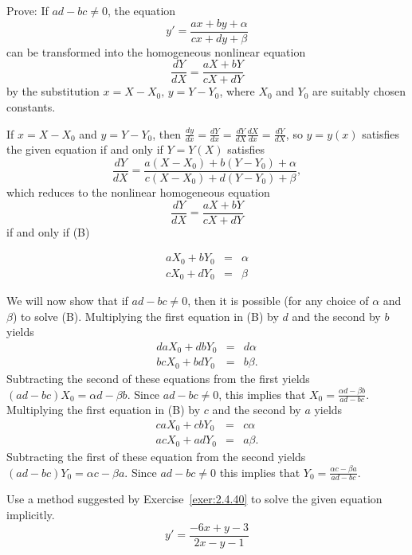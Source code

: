 \documentclass{ximera}
\begin{document}
\begin{problem}\label{exer:2.4.40}
Prove:  If $ad-bc\neq 0$, the equation
$$
y'=\frac{ax+by+\alpha}{cx+dy+\beta}
$$
can be transformed into the homogeneous nonlinear equation
$$
\frac{dY}{dX}=\frac{aX+bY}{cX+dY}
$$
by the substitution $x=X-X_0,\,  y=Y-Y_0$,
where $X_0$ and $Y_0$ are suitably chosen constants.

\begin{solution}
    If $x=X-X_0$ and $y=Y-Y_0$, then $\frac{dy}{ dx}=\frac{dY}{
dx}=\frac{dY}{ dX}\frac{dX}{ dx}=\frac{dY}{ dX}$, so $y=y(x)$
satisfies the given equation if and only if $Y=Y(X)$ satisfies
 $$
\frac{dY}{dX}=\frac{a(X-X_0)+b(Y-Y_0)+\alpha}{
c(X-X_0)+d(Y-Y_0)+\beta},
$$
 which reduces to the nonlinear homogeneous equation
$$
\frac{dY}{ dX}=\frac{aX+bY}{ cX+dY}
$$
 if and only if (B)

\begin{eqnarray*}
aX_0+bY_0&=&\alpha\\
cX_0+dY_0&=&\beta
\end{eqnarray*}

We will now show that
if $ad-bc\neq 0$, then it is possible (for any choice of $\alpha$
and $\beta$) to solve (B).
Multiplying the first equation in (B) by $d$ and
 the second by  $b$ yields
\begin{eqnarray*}
daX_0+dbY_0&=&d\alpha  \\
bcX_0+bdY_0&=&b\beta.
\end{eqnarray*}
Subtracting the second of these equations from the first yields
 $(ad-bc)X_0=\alpha d-\beta b$.
Since $ad-bc\neq 0$, this implies that $X_0=\frac{\alpha d-\beta b}{
ad-bc}$. Multiplying the first equation in (B) by
$c$ and the second by $a$ yields
\begin{eqnarray*}
caX_0+cbY_0&=&c\alpha  \\
acX_0+adY_0&=&a\beta.
\end{eqnarray*}
Subtracting the first of these equation from the second yields
 $(ad-bc)Y_0=\alpha c-\beta a$. Since $ad-bc\ne0$ this implies that
$Y_0=\frac{\alpha c-\beta a}{ ad-bc}$.
\end{solution}
\end{problem}

\begin{problem}\label{exer:2.4.41} Use a method suggested by Exercise~\ref{exer:2.4.40} to solve the
given equation implicitly.
$$y'=\frac{-6x+y-3}{2x-y-1}$$
\end{problem}
\end{document}
